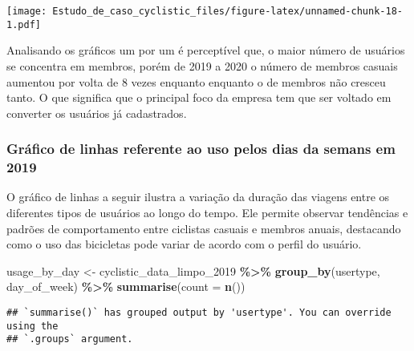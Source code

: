 \documentclass[
]{article}
\newenvironment{Shaded}{\begin{snugshade}}{\end{snugshade}}
\newcommand{\AttributeTok}[1]{\textcolor[rgb]{0.13,0.29,0.53}{#1}}
\newcommand{\FunctionTok}[1]{\textcolor[rgb]{0.13,0.29,0.53}{\textbf{#1}}}
\newcommand{\NormalTok}[1]{#1}
\newcommand{\OtherTok}[1]{\textcolor[rgb]{0.56,0.35,0.01}{#1}}
\newcommand{\SpecialCharTok}[1]{\textcolor[rgb]{0.81,0.36,0.00}{\textbf{#1}}}
\begin{document}
\texttt{[image: Estudo\_de\_caso\_cyclistic\_files/figure-latex/unnamed-chunk-18-1.pdf]}

Analisando os gráficos um por um é perceptível que, o maior número de
usuários se concentra em membros, porém de 2019 a 2020 o número de
membros casuais aumentou por volta de 8 vezes enquanto enquanto o de
membros não cresceu tanto. O que significa que o principal foco da
empresa tem que ser voltado em converter os usuários já cadastrados.

\subsubsection{Gráfico de linhas referente ao uso pelos dias da semans
em
2019}\label{gruxe1fico-de-linhas-referente-ao-uso-pelos-dias-da-semans-em-2019}

O gráfico de linhas a seguir ilustra a variação da duração das viagens
entre os diferentes tipos de usuários ao longo do tempo. Ele permite
observar tendências e padrões de comportamento entre ciclistas casuais e
membros anuais, destacando como o uso das bicicletas pode variar de
acordo com o perfil do usuário.

\begin{Shaded}
\begin{Highlighting}[]
\NormalTok{usage\_by\_day }\OtherTok{\textless{}{-}}\NormalTok{ cyclistic\_data\_limpo\_2019 }\SpecialCharTok{\%\textgreater{}\%}
  \FunctionTok{group\_by}\NormalTok{(usertype, day\_of\_week) }\SpecialCharTok{\%\textgreater{}\%}
  \FunctionTok{summarise}\NormalTok{(}\AttributeTok{count =} \FunctionTok{n}\NormalTok{())}
\end{Highlighting}
\end{Shaded}

\begin{verbatim}
## `summarise()` has grouped output by 'usertype'. You can override using the
## `.groups` argument.
\end{verbatim}
\end{document}
